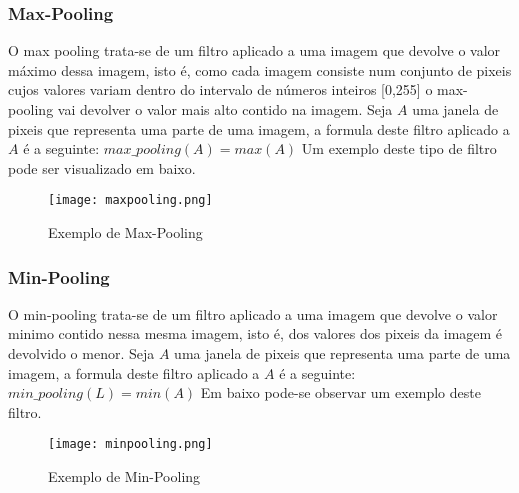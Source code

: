 \subsubsection{Max-Pooling}\hfill\newline
  \hfill\newline
  O max pooling trata-se de um filtro aplicado a uma imagem que devolve o valor máximo dessa imagem, isto é, como cada imagem consiste num conjunto de pixeis cujos valores variam dentro do intervalo de números inteiros [0,255] o max-pooling vai devolver o valor mais alto contido na imagem\cite{ref8}. Seja $A$ uma janela de pixeis que representa uma parte de uma imagem, a formula deste filtro aplicado a $A$ é a seguinte:\hfill\newline
  \hfill\newline
  $max\_pooling(A) = max(A)$
  \hfill\newline
  \hfill\newline
  Um exemplo deste tipo de filtro pode ser visualizado em baixo.

  \begin{figure}[H]

    \centering
    \captionsetup{justification=centering}

    \texttt{[image: maxpooling.png]}
    
    \caption {Exemplo de Max-Pooling}

  \end{figure}


\subsubsection{Min-Pooling}\hfill\newline
  \hfill\newline
  O min-pooling trata-se de um filtro aplicado a uma imagem que devolve o valor minimo contido nessa mesma imagem, isto é, dos valores dos pixeis da imagem é devolvido o menor. Seja $A$ uma janela de pixeis  que representa uma parte de uma imagem, a formula deste filtro aplicado a $A$ é a seguinte:\hfill\newline
  \hfill\newline
  $min\_pooling(L) = min(A)$
  \hfill\newline
  \hfill\newline
  Em baixo pode-se observar um exemplo deste filtro.

  \begin{figure}[H]

    \centering
    \captionsetup{justification=centering}

    \texttt{[image: minpooling.png]}
    
    \caption {Exemplo de Min-Pooling}

  \end{figure}


